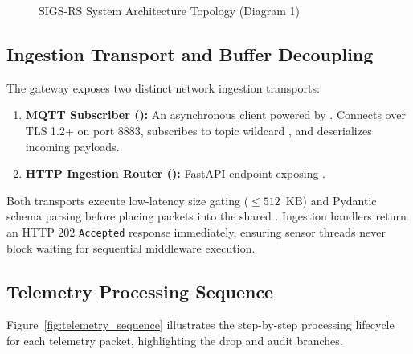 \documentclass[a4paper]{article}
\begin{document}
\begin{figure}[H]
{%
}
\caption{SIGS-RS System Architecture Topology (Diagram 1)}
\label{fig:system_architecture}
\end{figure}

\subsection{Ingestion Transport and Buffer Decoupling}
The gateway exposes two distinct network ingestion transports:
\begin{enumerate}[label=(\alph*)]
    \item \textbf{MQTT Subscriber ():} An asynchronous client powered by . Connects over TLS 1.2+ on port 8883, subscribes to topic wildcard , and deserializes incoming payloads.
    \item \textbf{HTTP Ingestion Router ():} FastAPI endpoint exposing .
\end{enumerate}

Both transports execute low-latency size gating ($\le 512$~KB) and Pydantic schema parsing before placing packets into the shared . Ingestion handlers return an HTTP 202 \texttt{Accepted} response immediately, ensuring sensor threads never block waiting for sequential middleware execution.

\subsection{Telemetry Processing Sequence}
Figure~\ref{fig:telemetry_sequence} illustrates the step-by-step processing lifecycle for each telemetry packet, highlighting the drop and audit branches.
\end{document}
